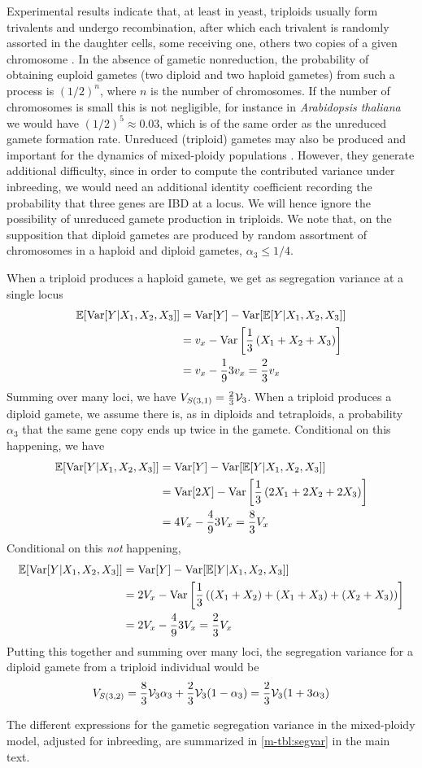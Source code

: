 \documentclass[11pt,a4paper]{article}
\begin{document}
Experimental results indicate that, at least in yeast, triploids usually form
trivalents and undergo recombination, after which each trivalent is randomly
assorted in the daughter cells, some receiving one, others two copies of a
given chromosome \citep{charles2010}.
In the absence of gametic nonreduction, the probability
of obtaining euploid gametes (two diploid and two haploid gametes) from such 
a process is $(1/2)^n$, where $n$ is the number of chromosomes. If the number
of chromosomes is small this is not negligible, for instance in
\textit{Arabidopsis thaliana} we would have $(1/2)^5 \approx 0.03$, which is of
the same order as the unreduced gamete formation rate.
Unreduced (triploid) gametes may also be produced and important for the
dynamics of mixed-ploidy populations \citep{ramsey1998}.
However, they generate additional difficulty, since in order to compute the
contributed variance under inbreeding, we would need an additional identity
coefficient recording the probability that three genes are IBD at a locus.
We will hence ignore the possibility of unreduced gamete production in
triploids.
We note that, on the supposition that diploid gametes are produced by random
assortment of chromosomes in a haploid and diploid gametes, $\alpha_3 \le 1/4$.

When a triploid produces a haploid gamete, we get as segregation variance at a
single locus
\begin{align*}
  \mathbb{E}[\mathrm{Var}[Y|X_1,X_2,X_3]] &= \mathrm{Var}[Y] - \mathrm{Var}[\mathbb{E}[Y|X_1,X_2,X_3]] \\
    &= v_x - \mathrm{Var}\left[\frac{1}{3}\left(X_1 + X_2 + X_3\right)\right] \\ 
    &= v_x - \frac{1}{9}3v_x = \frac{2}{3}v_x
\end{align*}
Summing over many loci, we have $V_{S(3,1)} = \frac{2}{3}\mathcal{V}_{3}$.
When a triploid produces a diploid gamete, we assume there is, as in diploids
and tetraploids, a probability $\alpha_3$ that the same gene copy ends up twice
in the gamete.
Conditional on this happening, we have
\begin{align*}
  \mathbb{E}[\mathrm{Var}[Y|X_1,X_2,X_3]] &= \mathrm{Var}[Y] - \mathrm{Var}[\mathbb{E}[Y|X_1,X_2,X_3]] \\
    &= \mathrm{Var}[2X] - \mathrm{Var}\left[\frac{1}{3}\left(2X_1 + 2X_2 + 2X_3\right)\right] \\
    &= 4V_x - \frac{4}{9}3V_x = \frac{8}{3}V_x
\end{align*}
Conditional on this \textit{not} happening, 
\begin{align*}
  \mathbb{E}[\mathrm{Var}[Y|X_1,X_2,X_3]] &= \mathrm{Var}[Y] - \mathrm{Var}[\mathbb{E}[Y|X_1,X_2,X_3]] \\
    &= 2V_x - \mathrm{Var}\left[\frac{1}{3}\left((X_1+X_2) + (X_1+X_3) +
      (X_2+X_3)\right)\right] \\
    &= 2V_x - \frac{4}{9}3V_x = \frac{2}{3}V_x
\end{align*} 
Putting this together and summing over many loci, the segregation variance for
a diploid gamete from a triploid individual would be
  $$V_{S(3,2)} = \frac{8}{3}\mathcal{V}_{3}\alpha_3 + \frac{2}{3}\mathcal{V}_{3} (1-\alpha_3) 
            = \frac{2}{3}\mathcal{V}_{3}(1 + 3\alpha_3)$$ 

The different expressions for the gametic segregation variance in the
mixed-ploidy model, adjusted for inbreeding, are summarized in
\cref{m-tbl:segvar} in the main text.




\end{document}
